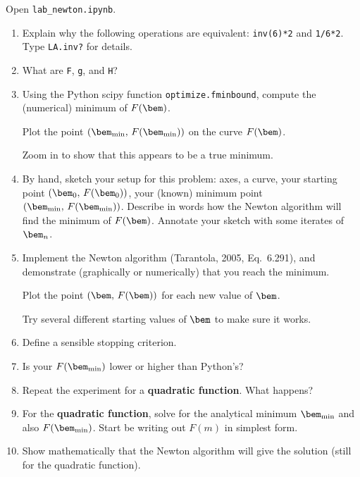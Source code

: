 \documentclass[11pt,titlepage,fleqn]{article}
\renewcommand{\vertgap}{\vspace{1.5cm}}
\begin{document}
Open \verb+lab_newton.ipynb+.
%
\begin{enumerate}
\item Explain why the following operations are equivalent: \verb+inv(6)*2+ and \verb+1/6*2+. \\
Type \verb+LA.inv?+ for details.

\vertgap

\item What are \verb+F+, \verb+g+, and \verb+H+?

\vertgap

\item Using the Python scipy function \verb+optimize.fminbound+, compute the (numerical) minimum of $F(\bem)$.

Plot the point $(\bem_{\rm min},\,F(\bem_{\rm min}))$ on the curve $F(\bem)$.

Zoom in to show that this appears to be a true minimum.

\item By hand, sketch your setup for this problem: axes, a curve, your starting point $(\bem_0,\,F(\bem_0))$, your (known) minimum point $(\bem_{\rm min},\,F(\bem_{\rm min}))$. Describe in words how the Newton algorithm will find the minimum of $F(\bem)$. Annotate your sketch with some iterates of $\bem_n$.

\vspace{10cm}

\item Implement the Newton algorithm (Tarantola, 2005, Eq.~6.291), and demonstrate (graphically or numerically) that you reach the minimum.

Plot the point $(\bem,\,F(\bem))$ for each new value of $\bem$.

Try several different starting values of $\bem$ to make sure it works.

\vertgap

\item Define a sensible stopping criterion.

\vertgap

\item Is your $F(\bem_{\rm min})$ lower or higher than Python's?

\vertgap

\item Repeat the experiment for a {\bf quadratic function}. What happens?



\item For the {\bf quadratic function}, solve for the analytical minimum $\bem_{\rm min}$ and also $F(\bem_{\rm min})$. Start be writing out $F(m)$ in simplest form.

\vspace{6cm}

\item Show mathematically that the Newton algorithm will give the solution (still for the quadratic function).

\end{enumerate}

%
%

\end{document}
